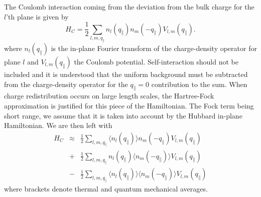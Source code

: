 \documentclass[twocolumn, preprintnumbers,prb,aps,amssymb,showpacs]{revtex4}
\begin{document}
The Coulomb interaction coming from the deviation from the bulk charge for the $l$'th plane is given by
\begin{equation}
H_{C}=\frac{1}{2}\sum_{l,m,q_{\parallel}}n_l(q_{\parallel})n_m(-q_{\parallel})V_{l,m}(q_{\parallel}).
\end{equation}
where $n_l(q_{\parallel})$ is the in-plane Fourier transform of the charge-density operator for plane $l$ and $V_{l,m}(q_{\parallel})$ the Coulomb potential. Self-interaction should not be included and it is understood that the uniform background must be subtracted from the charge-density operator for the $q_{\parallel}=0$ contribution to the sum. When charge redistribution occurs on large length scales, the Hartree-Fock approximation is justified for this piece of the Hamiltonian. The Fock term being short range, we assume that it is taken into account by the Hubbard in-plane Hamiltonian. We are then left with 
\begin{eqnarray}
H_{C}&\approx&\frac{1}{2}\sum_{l,m,q_{\parallel}}\langle n_l(q_{\parallel})\rangle n_m(-q_{\parallel})V_{l,m}(q_{\parallel})\nonumber \\
&+&\frac{1}{2}\sum_{l,m,q_{\parallel}}n_l(q_{\parallel})\langle n_m(-q_{\parallel})\rangle V_{l,m}(q_{\parallel})\nonumber \\
&-&\frac{1}{2}\sum_{l,m,q_{\parallel}}\langle n_l(q_{\parallel})\rangle \langle n_m(-q_{\parallel})\rangle V_{l,m}(q_{\parallel})
\end{eqnarray}
where brackets denote thermal and quantum mechanical averages. 
\end{document}
